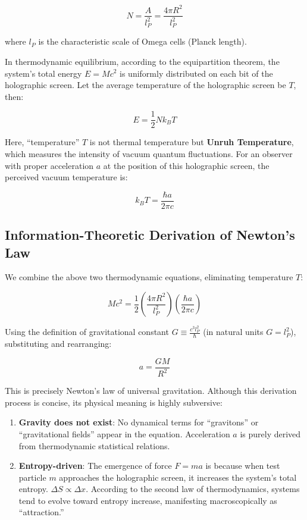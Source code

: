 \[N = \frac{A}{l_P^2} = \frac{4\pi R^2}{l_P^2}\]

where $l_P$ is the characteristic scale of Omega cells (Planck length).

In thermodynamic equilibrium, according to the equipartition theorem, the system's total energy $E = Mc^2$ is uniformly distributed on each bit of the holographic screen. Let the average temperature of the holographic screen be $T$, then:

\[E = \frac{1}{2} N k_B T\]

Here, ``temperature'' $T$ is not thermal temperature but \textbf{Unruh Temperature}, which measures the intensity of vacuum quantum fluctuations. For an observer with proper acceleration $a$ at the position of this holographic screen, the perceived vacuum temperature is:

\[k_B T = \frac{\hbar a}{2\pi c}\]

\subsection{Information-Theoretic Derivation of Newton's Law}

We combine the above two thermodynamic equations, eliminating temperature $T$:

\[Mc^2 = \frac{1}{2} \left( \frac{4\pi R^2}{l_P^2} \right) \left( \frac{\hbar a}{2\pi c} \right)\]

Using the definition of gravitational constant $G \equiv \frac{c^3 l_P^2}{\hbar}$ (in natural units $G=l_P^2$), substituting and rearranging:

\[a = \frac{G M}{R^2}\]

This is precisely Newton's law of universal gravitation.
Although this derivation process is concise, its physical meaning is highly subversive:

\begin{enumerate}
\item \textbf{Gravity does not exist}: No dynamical terms for ``gravitons'' or ``gravitational fields'' appear in the equation. Acceleration $a$ is purely derived from thermodynamic statistical relations.
\item \textbf{Entropy-driven}: The emergence of force $F = ma$ is because when test particle $m$ approaches the holographic screen, it increases the system's total entropy. $\Delta S \propto \Delta x$. According to the second law of thermodynamics, systems tend to evolve toward entropy increase, manifesting macroscopically as ``attraction.''
\end{enumerate}

